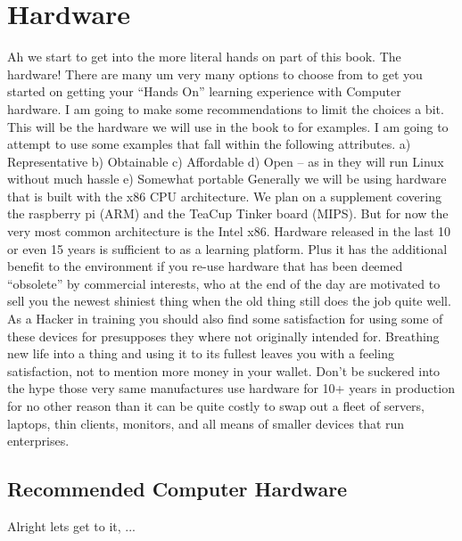 \chapter{Hardware}

Ah we start to get into the more literal hands on part of this book. The hardware! There are many um very many options to choose from to get you started on getting your “Hands On” learning experience with Computer hardware. I am going to make some recommendations to limit the choices a bit. This will be the hardware we will use in the book to for examples. I am going to attempt to use some examples that fall within the following attributes. 
a) Representative
b) Obtainable
c) Affordable 
d) Open – as in they will run Linux without much hassle
e) Somewhat portable
Generally we will be using hardware that is built with the x86 CPU architecture. We plan on a supplement covering the raspberry pi (ARM) and the TeaCup Tinker board (MIPS). But for now the very most common architecture is the Intel x86.
Hardware released in the last 10 or even 15 years is sufficient to as a learning platform. Plus it has the additional benefit to the environment if you re-use hardware that has been deemed “obsolete” by commercial interests, who at the end of the day are motivated to sell you the newest shiniest thing when the old thing still does the job quite well. 
As a Hacker in training you should also find some satisfaction for using some of these devices for presupposes they where not originally intended for. Breathing new life into a thing and using it to its fullest leaves you with a feeling satisfaction, not to mention more money in your wallet. Don’t be suckered into the hype those very same manufactures use hardware for 10+ years in production for no other reason than it can be quite costly to swap out a fleet of servers, laptops, thin clients, monitors, and all means of smaller devices that run enterprises.

\section{Recommended Computer Hardware}

Alright lets get to it, ...
